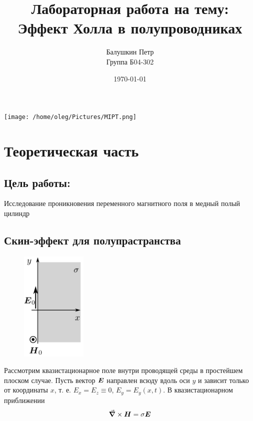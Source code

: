 \documentclass[a4paper, 12pt]{article}
\begin{document}
\graphicspath{{pictures/}}
\begin{titlepage}
    \title{Лабораторная работа на тему: \\    
    Эффект Холла в полупроводниках}
    \author{Балушкин Петр \\
    Группа Б04-302}
    \date{\today}
    \maketitle
    \vfill
    \begin{center}
        \texttt{[image: /home/oleg/Pictures/MIPT.png]}
    \end{center}
\end{titlepage}

    \section*{Теоретическая часть}
    \subsection*{Цель работы:} Исследование проникновения переменного магнитного поля в медный полый цилиндр
	
	\subsection*{Скин-эффект для полупрастранства}
	\vspace{1cm}
	\begin{figure}
		\begin{center}
			\includegraphics[width=0.28\textwidth]{poluprostranstvo.png}
		\end{center}
	\end{figure}
	
	Рассмотрим квазистационарное поле внутри проводящей среды в простейшем плоском случае.
	Пусть вектор $\vb*{E}$ направлен всюду вдоль оси $y$ и зависит только от координаты $x$, т. е. ${E_x} = {E_z} \equiv 0$, $E_y=E_y(x,t)$.
	В квазистационарном приближении 
	\begin{equation*}
		\grad \times \vb*{H} = \sigma \vb*{E}
	\end{equation*}
	
\end{document}

